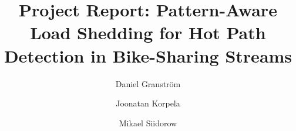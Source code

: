 \documentclass[sigconf]{acmart}
\begin{document}
\title[Project Report]{Project Report: Pattern-Aware Load Shedding for Hot Path Detection in Bike-Sharing Streams}



\author{Daniel Granstr{\"o}m}


\author{Joonatan Korpela}

\author{Mikael Siidorow}

\renewcommand{\shortauthors}{Granström, Korpela, Siidorow}
\end{document}
